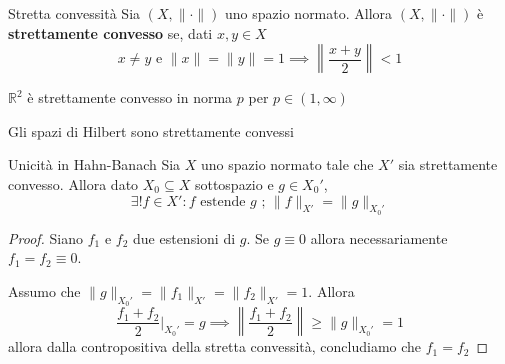 \begin{definition}{Stretta convessità}
    Sia \({(X, \|\cdot \|)}\) uno spazio normato. Allora \({(X, \|\cdot \|)}\) è
    \textbf{strettamente convesso} se, dati \(
    x, y \in X\) 
    \[
      x\neq y \text{ e }\|x\| = \|y\| = 1 \implies \left\|\frac{x+y}{2}\right\| < 1
    \]
\end{definition}
\begin{example}{}
    \(\mathbb{R}^2\) è strettamente convesso in norma \(p\) per \(p \in (1, \infty)\) 
\end{example}
\begin{example}[Spoiler]
    Gli spazi di Hilbert sono strettamente convessi
\end{example}
\begin{proposition}{Unicità in Hahn-Banach}
    Sia \(X\) uno spazio normato tale che \(X'\) sia strettamente convesso.
    Allora dato \(X_{0} \subseteq X \) sottospazio e \(g \in X_{0}'\), 
    \[
      \exists ! f \in X' : f \text{ estende } g \text{ ; } \|f\|_{X'}  = \|g\|_{X_{0}'} 
    \]
\end{proposition}
\begin{proof}{}
    Siano \(f_{1}\) e \(f_{2}\) due estensioni di \(g\). Se \(g \equiv 0\)
    allora necessariamente \(f_{1} = f_{2} \equiv 0\).

    Assumo che \(\|g\|_{X_{0}'} = \|f_{1}\|_{X'}  = \|f_{2}\|_{X'} = 1\). Allora
    \[
      \frac{f_{1}+f_{2}}{2} \big|_{X_{0}'} = g \implies \left\|
      \frac{f_{1} + f_{2}}{2}\right\| \ge \|g\|_{X_{0}'} = 1
    \]
    allora dalla contropositiva della stretta convessità, concludiamo che \(f_{1} = f_{2}\) 
\end{proof}

